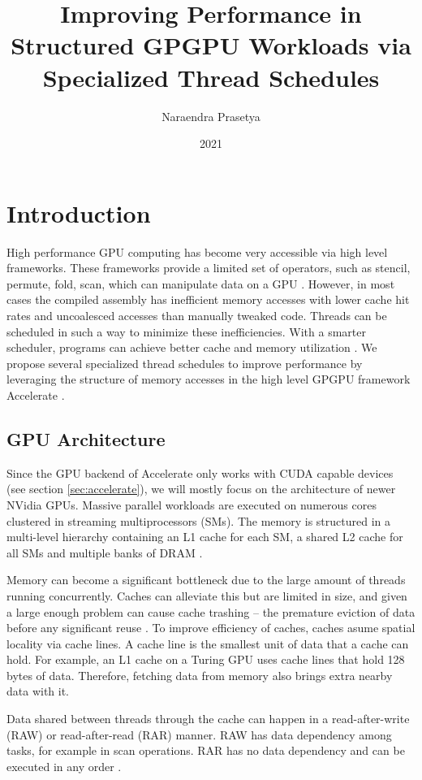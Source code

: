 \documentclass{article}
\title{Improving Performance in Structured GPGPU Workloads via Specialized Thread Schedules}
\author{Naraendra Prasetya}
\date{2021}
\begin{document}
\maketitle

\section{Introduction}    
High performance GPU computing has become very accessible via high level frameworks.
These frameworks provide a limited set of operators, such as stencil, permute, fold, scan, which can manipulate data on a GPU \cite{chakravarty2011accelerating}.
However, in most cases the compiled assembly has inefficient memory accesses with lower cache hit rates and uncoalesced accesses than manually tweaked code.
Threads can be scheduled in such a way to minimize these inefficiencies.
With a smarter scheduler, programs can achieve better cache and memory utilization \cite{nugteren2014study}.
We propose several specialized thread schedules to improve performance by leveraging the structure of memory accesses in the high level GPGPU framework Accelerate \cite{chakravarty2011accelerating}.

\subsection{GPU Architecture}
Since the GPU backend of Accelerate only works with CUDA capable devices (see section \ref{sec:accelerate}), we will mostly focus on the architecture of newer NVidia GPUs.
Massive parallel workloads are executed on numerous cores clustered in streaming multiprocessors (SMs).
The memory is structured in a multi-level hierarchy containing an L1 cache for each SM, a shared L2 cache for all SMs and multiple banks of DRAM \cite{nvidia2017volta,nvidia2020ampere}.

Memory can become a significant bottleneck due to the large amount of threads running concurrently.
Caches can alleviate this but are limited in size, and given a large enough problem can cause cache trashing -- the premature eviction of data before any significant reuse \cite{dai2016model}.
To improve efficiency of caches, caches asume spatial locality via cache lines.
A cache line is the smallest unit of data that a cache can hold.
For example, an L1 cache on a Turing GPU uses cache lines that hold 128 bytes of data.
Therefore, fetching data from memory also brings extra nearby data with it.

Data shared between threads through the cache can happen in a read-after-write (RAW) or read-after-read (RAR) manner.
RAW has data dependency among tasks, for example in scan operations.
RAR has no data dependency and can be executed in any order \cite{tripathy2021paver}.
\end{document}
